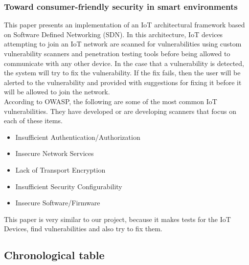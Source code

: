 \subsubsection{Toward consumer-friendly security in smart environments}\cite{Paper7}
This paper presents an implementation of an IoT architectural framework based on Software Defined Networking (SDN). In this architecture, IoT devices attempting to join an IoT network are scanned for vulnerabilities using custom vulnerability scanners and penetration testing tools before being allowed to communicate with any other device. In the case that a vulnerability is detected, the system will try to fix the vulnerability. If the fix fails, then the user will be alerted to the vulnerability and provided with suggestions for fixing it before it will be allowed to join the network.\\
According to OWASP, the following are some of the most common IoT vulnerabilities. They have developed or are developing scanners that focus on each of these items.
\begin{itemize}
	\item Insufficient Authentication/Authorization
	\item Insecure Network Services
	\item Lack of Transport Encryption
	\item Insufficient  Security  Configurability
	\item Insecure Software/Firmware
\end{itemize}
This paper is very similar to our project, because it makes tests for the IoT Devices, find vulnerabilities and also try to fix them.

\subsection{Chronological table}

